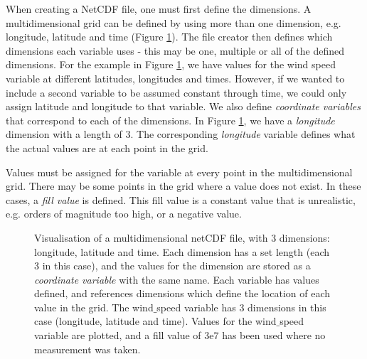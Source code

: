 \documentclass[a4paper,english, 11pt]{article}
\begin{document}
When creating a NetCDF file, one must first define the dimensions. A multidimensional grid can be defined by using more than one dimension, e.g. longitude, latitude and time (Figure \ref{fig:netcdf}). The file creator then defines which dimensions each variable uses - this may be one, multiple or all of the defined dimensions. For the example in Figure \ref{fig:netcdf}, we have values for the wind speed variable at different latitudes, longitudes and times. However, if we wanted to include a second variable to be assumed constant through time, we could only assign latitude and longitude to that variable. We also define \textit{coordinate variables} that correspond to each of the dimensions. In Figure \ref{fig:netcdf}, we have a \textit{longitude} dimension with a length of 3. The corresponding \textit{longitude} variable defines what the actual values are at each point in the grid. 

Values must be assigned for the variable at every point in the multidimensional grid. There may be some points in the grid where a value does not exist. In these cases, a \textit{fill value} is defined. This fill value is a constant value that is unrealistic, e.g. orders of magnitude too high, or a negative value.

\begin{figure}[htb]
    \caption{\label{fig:netcdf}
        Visualisation of a multidimensional netCDF file, with 3 dimensions: longitude, latitude and time.
        Each dimension has a set length (each 3 in this case), and the values
        for the dimension are stored as a \textit{coordinate variable} with the same name.
        Each variable has values defined, and references dimensions which define the location of each value in the grid. The wind$\_$speed variable has 3 dimensions in this case (longitude, latitude and time). Values for the wind$\_$speed variable are plotted, and a fill value of 3e7 has been used where no measurement was taken. 
    }
\end{figure}
\end{document}

